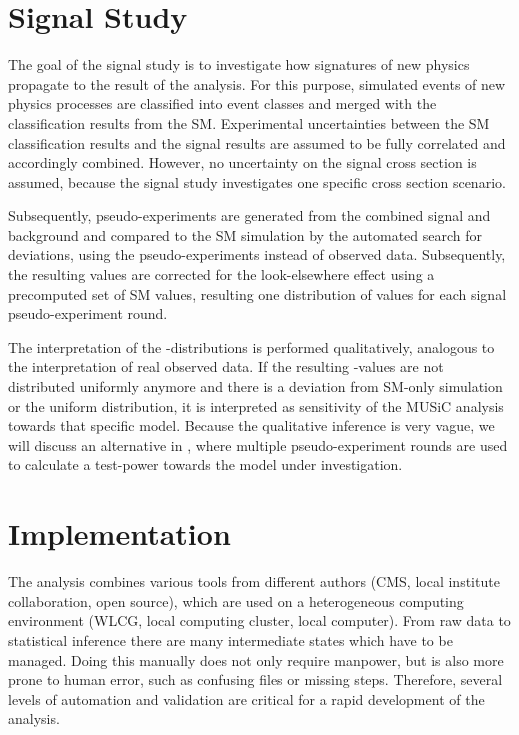 \section{Signal Study}
\label{sec:signal_study}

The goal of the signal study is to investigate how signatures of new physics propagate to the result of the analysis. For this purpose, simulated events of new physics processes are classified into event classes and merged with the classification results from the \acl{SM}. Experimental uncertainties between the \ac{SM} classification results and the signal results are assumed to be fully correlated and accordingly combined. However, no uncertainty on the signal cross section is assumed, because the signal study investigates one specific cross section scenario.

Subsequently, pseudo-experiments are generated from the combined signal and background and compared to the \ac{SM} simulation by the automated search for deviations, using the pseudo-experiments instead of observed data. Subsequently, the resulting \TSmin values are corrected for the look-elsewhere effect using a precomputed set of \ac{SM} \TS values, resulting one distribution of \ptilde values for each signal pseudo-experiment round.
 
The interpretation of the \ptilde-distributions is performed qualitatively, analogous to the interpretation of real observed data. If the resulting \ptilde-values are not distributed uniformly anymore and there is a deviation from \ac{SM}-only simulation or the uniform distribution, it is interpreted as sensitivity of the \ac{MUSiC} analysis towards that specific model.
Because the qualitative inference is very vague, we will discuss an alternative in , where multiple pseudo-experiment rounds are used to calculate a test-power towards the model under investigation.

\section{Implementation}
The analysis combines various tools from different authors (\ac{CMS}, local institute collaboration, open source), which are used on a heterogeneous computing environment (\ac{WLCG}, local computing cluster, local computer). From raw data to statistical inference there are many intermediate states which have to be managed. Doing this manually does not only require manpower, but is also more prone to human error, such as confusing files or missing steps. Therefore, several levels of automation and validation are critical for a rapid development of the analysis.

